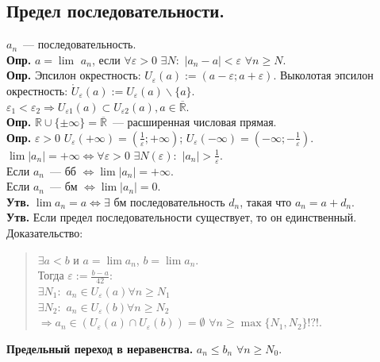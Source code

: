\documentclass{article}
\begin{document}
	\subsection{Предел последовательности.}
	$a_n$~--- последовательность. \\
	\textbf{Опр.} $a = \lim$ $a_n$, если $\forall \varepsilon > 0$ $\exists N:$ $|a_n - a| < \varepsilon$ $\forall n \geqslant N$. \\
	\textbf{Опр.} Эпсилон окрестность: $U_{\varepsilon} (a) := (a - \varepsilon; a + \varepsilon)$. Выколотая эпсилон окрестность: $\mathring{U}_{\varepsilon} (a) := U_{\varepsilon}(a) \backslash \{a\}$. \\
	$\varepsilon_1 < \varepsilon_2 \Rightarrow U_{\varepsilon1}(a) \subset U_{\varepsilon2}(a), a \in \overline{\mathbb{R}}$. \\
	\textbf{Опр.} $\mathbb{R} \cup \{\pm \infty\} = \overline{\mathbb{R}}$~--- расширенная числовая прямая. \\
	\textbf{Опр.} $\varepsilon > 0$ $U_{\varepsilon} (+ \infty) = (\frac{1}{\varepsilon}; + \infty)$; $U_{\varepsilon}(- \infty) = (- \infty; -\frac{1}{\varepsilon})$. \\
	$\lim |a_n| = + \infty \Leftrightarrow \forall \varepsilon > 0$ $\exists N(\varepsilon):$ $|a_n| > \frac{1}{\varepsilon}$. \\
	Если $a_n$~--- бб $\Leftrightarrow \lim |a_n| = + \infty$. \\
	Если $a_n$~--- бм $\Leftrightarrow \lim |a_n| = 0$. \\
	\textbf{Утв.} $\lim a_n = a \Leftrightarrow \exists$ бм последовательность $d_n$, такая что $a_n = a + d_n$. \\
	\textbf{Утв.} Если предел последовательности существует, то он единственный. \\
	Доказательство:
	\begin{quote}
		$\exists a < b$ и $a = \lim a_n$, $b = \lim a_n$. \\
		Тогда $\varepsilon := \frac{b - a}{42}:$ \\
		$\exists N_1:$ $a_n \in U_{\varepsilon} (a) \forall n \geqslant N_1$ \\
		$\exists N_2:$ $a_n \in U_{\varepsilon} (b) \forall n \geqslant N_2$ \\
		$\Rightarrow a_n \in (U_{\varepsilon} (a) \cap U_{\varepsilon} (b)) = \emptyset$ $\forall n \geqslant \max\{N_1, N_2\} !?!$.
	\end{quote}
	\textbf{Предельный переход в неравенства.} $a_n \leqslant b_n$ $\forall n \geqslant N_{0}$. \\
\end{document}

